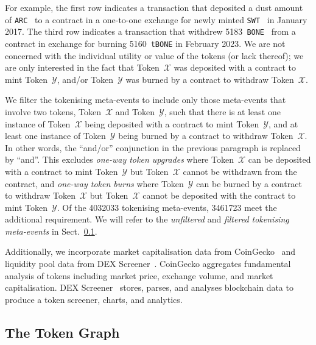 For example, the first row indicates a transaction that deposited a
dust amount of \texttt{ARC}~\cite{arcade-city-xx} to a contract in a
one-to-one exchange for newly minted \texttt{SWT}~\cite{swarm-city-xx}
in January 2017.  The third row indicates a transaction that withdrew
\num{5183}~\texttt{BONE}~\cite{shiba-inu-xx} from a contract in
exchange for burning \num{5160}~\texttt{tBONE} in February 2023.  We
are not concerned with the individual utility or value of the tokens
(or lack thereof); we are only interested in the fact that
Token~$\mathcal{X}$ was deposited with a contract to mint
Token~$\mathcal{Y}$, and/or Token~$\mathcal{Y}$ was burned by a
contract to withdraw Token~$\mathcal{X}$.

We filter the tokenising meta-events to include only those meta-events
that involve two tokens, Token~$\mathcal{X}$ and Token~$\mathcal{Y}$,
such that there is at least one instance of Token~$\mathcal{X}$ being
deposited with a contract to mint Token~$\mathcal{Y}$, and at least
one instance of Token~$\mathcal{Y}$ being burned by a contract to
withdraw Token~$\mathcal{X}$.  In other words, the ``and/or''
conjunction in the previous paragraph is replaced by ``and''.  This
excludes \textit{one-way token upgrades} where Token~$\mathcal{X}$ can
be deposited with a contract to mint Token~$\mathcal{Y}$ but
Token~$\mathcal{X}$ cannot be withdrawn from the contract, and
\textit{one-way token burns} where Token~$\mathcal{Y}$ can be burned
by a contract to withdraw Token~$\mathcal{X}$ but Token~$\mathcal{X}$
cannot be deposited with the contract to mint Token~$\mathcal{Y}$.  Of
the \num{4032033} tokenising meta-events, \num{3461723} meet the
additional requirement.  We will refer to the \textit{unfiltered} and
\textit{filtered tokenising meta-events} in
Sect.~\ref{sec:token-comp-token-graph}.

Additionally, we incorporate market capitalisation data from
CoinGecko~\cite{gecko-labs-xx} and liquidity pool data from DEX
Screener~\cite{dex-screener-xx}.  CoinGecko aggregates fundamental
analysis of tokens including market price, exchange volume, and market
capitalisation. DEX Screener~\cite{dex-screener-xx} stores, parses,
and analyses blockchain data to produce a token screener, charts, and
analytics.

\subsection{The Token Graph}\label{sec:token-comp-token-graph}

